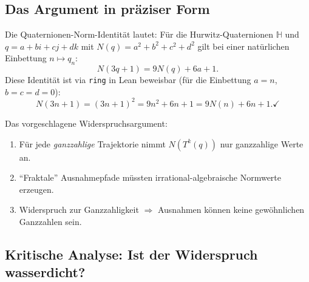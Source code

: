 \documentclass[12pt,a4paper]{article}
\newcommand{\H}{\mathbb{H}}
\begin{document}
\subsection{Das Argument in präziser Form}

Die Quaternionen-Norm-Identität lautet: Für die Hurwitz-Quaternionen
$\H$ und $q = a + bi + cj + dk$ mit $N(q) = a^2 + b^2 + c^2 + d^2$
gilt bei einer natürlichen Einbettung $n \mapsto q_n$:
\[
  N(3q + 1) = 9N(q) + 6a + 1.
\]
Diese Identität ist via \texttt{ring} in Lean beweisbar (für die
Einbettung $a = n$, $b = c = d = 0$):
\[
  N(3n+1) = (3n+1)^2 = 9n^2 + 6n + 1 = 9N(n) + 6n + 1. \checkmark
\]

Das vorgeschlagene Widerspruchsargument:
\begin{enumerate}[label=(\arabic*)]
  \item Für jede \emph{ganzzahlige} Trajektorie nimmt $N(T^k(q))$
    nur ganzzahlige Werte an.
  \item ``Fraktale'' Ausnahmepfade müssten irrational-algebraische
    Normwerte erzeugen.
  \item Widerspruch zur Ganzzahligkeit $\Rightarrow$ Ausnahmen können
    keine gewöhnlichen Ganzzahlen sein.
\end{enumerate}

\subsection{Kritische Analyse: Ist der Widerspruch wasserdicht?}
\end{document}
